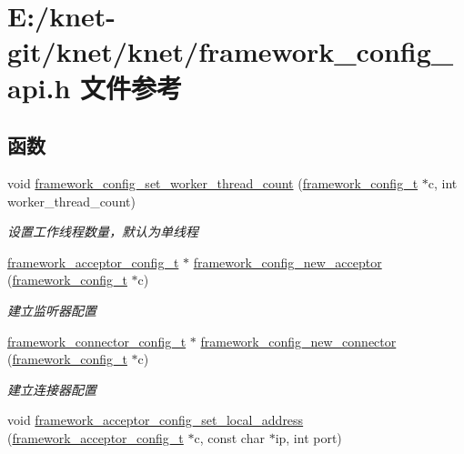 \hypertarget{a00056}{}\section{E\+:/knet-\/git/knet/knet/framework\+\_\+config\+\_\+api.h 文件参考}
\label{a00056}
\subsection*{函数}
\begin{DoxyCompactItemize}
\item 
void \hyperlink{a00103_ga46fc5d54c72138bced5ddd4068ef77e5_ga46fc5d54c72138bced5ddd4068ef77e5}{framework\+\_\+config\+\_\+set\+\_\+worker\+\_\+thread\+\_\+count} (\hyperlink{a00050_a55b26efa9e6ee05514d087ba2593a54b_a55b26efa9e6ee05514d087ba2593a54b}{framework\+\_\+config\+\_\+t} $\ast$c, int worker\+\_\+thread\+\_\+count)
\begin{DoxyCompactList}\small\item\em 设置工作线程数量，默认为单线程 \end{DoxyCompactList}\item 
\hyperlink{a00050_a61a4e424ff4c86631423dedd97c40064_a61a4e424ff4c86631423dedd97c40064}{framework\+\_\+acceptor\+\_\+config\+\_\+t} $\ast$ \hyperlink{a00103_ga74c94573fba40eb46f9e183fab029978_ga74c94573fba40eb46f9e183fab029978}{framework\+\_\+config\+\_\+new\+\_\+acceptor} (\hyperlink{a00050_a55b26efa9e6ee05514d087ba2593a54b_a55b26efa9e6ee05514d087ba2593a54b}{framework\+\_\+config\+\_\+t} $\ast$c)
\begin{DoxyCompactList}\small\item\em 建立监听器配置 \end{DoxyCompactList}\item 
\hyperlink{a00050_a81253f4c995b97e69be0e67f7a26097f_a81253f4c995b97e69be0e67f7a26097f}{framework\+\_\+connector\+\_\+config\+\_\+t} $\ast$ \hyperlink{a00103_ga4ff6334d19e68c08b5741ee7fed02f81_ga4ff6334d19e68c08b5741ee7fed02f81}{framework\+\_\+config\+\_\+new\+\_\+connector} (\hyperlink{a00050_a55b26efa9e6ee05514d087ba2593a54b_a55b26efa9e6ee05514d087ba2593a54b}{framework\+\_\+config\+\_\+t} $\ast$c)
\begin{DoxyCompactList}\small\item\em 建立连接器配置 \end{DoxyCompactList}\item 
void \hyperlink{a00103_ga5b3c778f37a4c667479d9eae877d3d67_ga5b3c778f37a4c667479d9eae877d3d67}{framework\+\_\+acceptor\+\_\+config\+\_\+set\+\_\+local\+\_\+address} (\hyperlink{a00050_a61a4e424ff4c86631423dedd97c40064_a61a4e424ff4c86631423dedd97c40064}{framework\+\_\+acceptor\+\_\+config\+\_\+t} $\ast$c, const char $\ast$ip, int port)

\end{DoxyCompactItemize}
